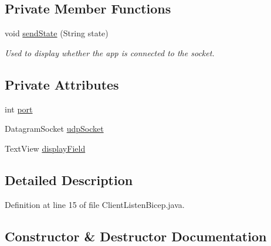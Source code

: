 \subsection*{Private Member Functions}
\begin{DoxyCompactItemize}
\item 
void \mbox{\hyperlink{classcom_1_1example_1_1trainawearapplication_1_1_client_listen_bicep_a1a9854e6d93822ec317a1e4e2ef781cb}{send\+State}} (String state)
\begin{DoxyCompactList}\small\item\em Used to display whether the app is connected to the socket. \end{DoxyCompactList}\end{DoxyCompactItemize}
\subsection*{Private Attributes}
\begin{DoxyCompactItemize}
\item 
int \mbox{\hyperlink{classcom_1_1example_1_1trainawearapplication_1_1_client_listen_bicep_a5277e5a6fa795cd86dcc35b08952b17c}{port}}
\item 
Datagram\+Socket \mbox{\hyperlink{classcom_1_1example_1_1trainawearapplication_1_1_client_listen_bicep_aa43b7aebe53f1efa443f014fe5efc7ab}{udp\+Socket}}
\item 
Text\+View \mbox{\hyperlink{classcom_1_1example_1_1trainawearapplication_1_1_client_listen_bicep_a9634b0b5b3f74403071bf066606a0555}{display\+Field}}
\end{DoxyCompactItemize}


\subsection{Detailed Description}


Definition at line 15 of file Client\+Listen\+Bicep.\+java.



\subsection{Constructor \& Destructor Documentation}
\mbox{\label{classcom_1_1example_1_1trainawearapplication_1_1_client_listen_bicep_a7a29935d4f0dd55a5dd0c0f5f93eba8c}} 
